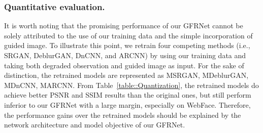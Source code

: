 \documentclass[runningheads]{llncs}
\begin{document}
\subsubsection{Quantitative evaluation.}
It is worth noting that the promising performance of our GFRNet cannot be solely attributed to the use of our training data and the simple incorporation of guided image.
To illustrate this point, we retrain four competing methods (i.e., SRGAN, DeblurGAN, DnCNN, and ARCNN) by using our training data and taking both degraded observation and guided image as input.
For the sake of distinction, the retrained models are represented as MSRGAN{, MDeblurGAN, MDnCNN, MARCNN}.
From Table~\ref{table::Quantization}, the retrained models do achieve better PSNR and SSIM results than the original ones, but still perform inferior to our GFRNet with a large margin, especially on WebFace.
Therefore, the performance gains over the retrained models should be explained by the network architecture and model objective of our GFRNet.
\end{document}
